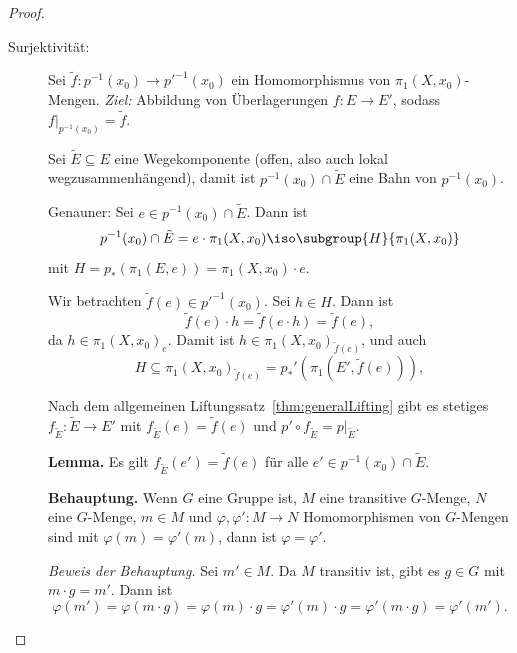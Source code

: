 \documentclass[language=ngerman]{TemplateLecture} %
\begin{document}
\begin{proof}
\begin{description}
\begin{description}
            \item[Surjektivität:] Sei $\tilde{f}: p^{-1}(x_0) \to p'^{-1}(x_0)$ ein Homomorphismus von $\pi_1(X,x_0)$-Mengen. \emph{Ziel:} Abbildung von Überlagerungen $f: E \to E'$, sodass $f|_{p^{-1}(x_0)} = \tilde{f}$.
            
            Sei $\tilde{E} \subseteq E$ eine Wegekomponente (offen, also auch lokal wegzusammenhängend), damit ist $p^{-1}(x_0) \cap \tilde{E}$ eine Bahn von $p^{-1}(x_0)$.

            Genauner: Sei $e \in p^{-1}(x_0) \cap \tilde{E}$. Dann ist 
            \begin{equation*}
                p^{-1}(x_0) \cap \tilde{E} = e \cdot \pi_1(X,x_0) \iso \subgroup{H}{\pi_1(X,x_0)}
            \end{equation*}
            mit $H = p_*(\pi_1(E,e)) = \pi_1(X,x_0) \cdot e$.

            Wir betrachten $\tilde{f}(e) \in p'^{-1}(x_0)$. Sei $h \in H$. Dann ist 
            \begin{equation*}
                \tilde{f}(e) \cdot h = \tilde{f}(e \cdot h) = \tilde{f}(e),
            \end{equation*}
            da $h \in \pi_1(X,x_0)_e$. Damit ist $h \in \pi_1(X,x_0)_{\tilde{f}(e)}$, und auch 
            \begin{equation*}
                H \subseteq \pi_1(X,x_0)_{\tilde{f}(e)} = p_*'(\pi_1(E', \tilde{f}(e))),
            \end{equation*}

            Nach dem allgemeinen Liftungssatz~\ref{thm:generalLifting}  gibt es stetiges $f_{\tilde{E}}: \tilde{E} \to E'$ mit $f_{\tilde{E}}(e) = \tilde{f}(e)$ und $p' \circ f_{\tilde{E}} = p|_{\tilde{E}}$.

            \textbf{Lemma.} Es gilt $f_{\tilde{E}}(e') = \tilde{f}(e)$ für alle $e' \in p^{-1}(x_0) \cap \tilde{E}$.

            \textbf{Behauptung.} Wenn $G$ eine Gruppe ist, $M$ eine transitive $G$-Menge, $N$ eine $G$-Menge, $m \in M$ und $\varphi, \varphi': M \to N$ Homomorphismen von $G$-Mengen sind mit $\varphi(m) = \varphi'(m)$, dann ist $\varphi = \varphi'$.

            \emph{Beweis der Behauptung.} Sei $m' \in M$. Da $M$ transitiv ist, gibt es $g \in G$ mit $m \cdot g = m'$. Dann ist
            \begin{equation*}
                \varphi(m') = \varphi(m \cdot g) = \varphi(m) \cdot g  = \varphi'(m) \cdot g = \varphi'(m \cdot g) = \varphi'(m').
            \end{equation*}


\end{description}
\end{description}
\end{proof}
\end{document}
